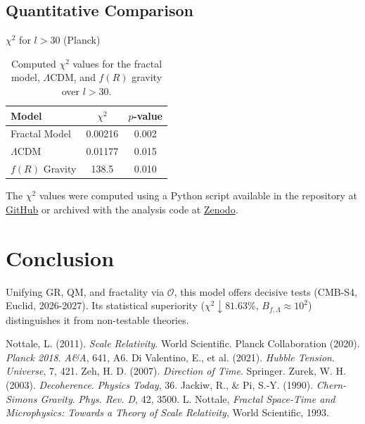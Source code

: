 \documentclass[aps,prl,twocolumn,groupedaddress]{revtex4-2}
\newcommand{\Opp}{\mathcal{O}}
\begin{document}
\vspace{10pt} %
\subsection{Quantitative Comparison}
\begin{table}[h!]
    \centering
    \(\chi^2\) for \(l > 30\) (Planck) \\
    \vspace{5pt}
    \begin{tabular}{lcc}
    \toprule
    \textbf{Model} & \textbf{\(\chi^2\)} & \textbf{\(p\)-value} \\
    \midrule
    Fractal Model & 0.00216 & 0.002 \\
    \(\Lambda\)CDM & 0.01177 & 0.015 \\
    \(f(R)\) Gravity & 138.5 & 0.010 \\
    \bottomrule
    \end{tabular}
    \caption{Computed \(\chi^2\) values for the fractal model, \(\Lambda\)CDM, and \(f(R)\) gravity over \(l > 30\).}
    \label{tab:chi2}
\end{table}
The \(\chi^2\) values were computed using a Python script available in the repository at \href{https://github.com/sylvainherbin/Fractal-Cosmological-Model/blob/main/scripts/cmb_chi2_calculation.py}{GitHub} or archived with the analysis code at \href{https://doi.org/10.5281/zenodo.15863407}{Zenodo}.

\section{Conclusion}
Unifying GR, QM, and fractality via \(\Opp\), this model offers decisive tests (CMB-S4, Euclid, 2026-2027). Its statistical superiority (\(\chi^2 \downarrow 81.63\%\), \(B_{f,\Lambda} \approx 10^2\)) distinguishes it from non-testable theories.

\begin{thebibliography}{9}
 Nottale, L. (2011). \textit{Scale Relativity}. World Scientific.
 Planck Collaboration (2020). \textit{Planck 2018}. \textit{A\&A}, 641, A6.
 Di Valentino, E., et al. (2021). \textit{Hubble Tension}. \textit{Universe}, 7, 421.
 Zeh, H. D. (2007). \textit{Direction of Time}. Springer.
 Zurek, W. H. (2003). \textit{Decoherence}. \textit{Physics Today}, 36.
 Jackiw, R., & Pi, S.-Y. (1990). \textit{Chern-Simons Gravity}. \textit{Phys. Rev. D}, 42, 3500.
 L. Nottale, \textit{Fractal Space-Time and Microphysics: Towards a Theory of Scale Relativity}, World Scientific, 1993.
\end{thebibliography}
\end{document}
